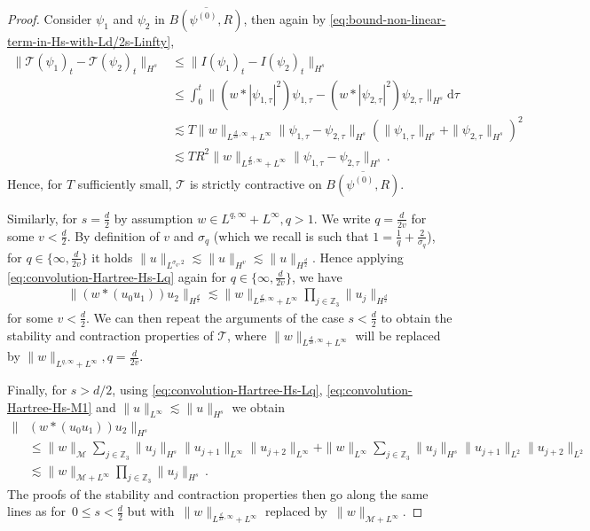 \documentclass[12pt]{article}
\theoremstyle{plain}
\newcommand{\meas}{\mathcal{M}}
\begin{document}
\begin{proof}
Consider $\psi_{1}$ and $\psi_{2}$ in $\overline{B(\psi^{(0)},R)}$,
then again by \eqref{eq:bound-non-linear-term-in-Hs-with-Ld/2s-Linfty},
\begin{align*}
\|\mathcal{T}(\psi_{1})_{t}-\mathcal{T}(\psi_{2})_{t}\|_{H^{s}} & \leq\|I(\psi_{1})_{t}-I(\psi_{2})_{t}\|_{H^{s}}\\
 & \leq\int_{0}^{t}\|(w*|\psi_{1,\tau}|^{2})\psi_{1,\tau}-(w*|\psi_{2,\tau}|^{2})\psi_{2,\tau}\|_{H^{s}}\mathrm{d}\tau\\
 & \lesssim T\|w\|_{L^{\frac{d}{2s},\infty}+L^{\infty}}\|\psi_{1,\tau}-\psi_{2,\tau}\|_{H^{s}}(\|\psi_{1,\tau}\|_{H^{s}}+\|\psi_{2,\tau}\|_{H^{s}})^{2}\\
 & \lesssim TR^{2}\|w\|_{L^{\frac{d}{2s},\infty}+L^{\infty}}\|\psi_{1,\tau}-\psi_{2,\tau}\|_{H^{s}}\,.
\end{align*}
Hence, for $T$ sufficiently small, $\mathcal{T}$ is strictly contractive
on $\overline{B(\psi^{(0)},R)}$.

Similarly, for $s = \frac{d}{2}$ by assumption $ w\in L^{q, \infty} + L^\infty, q>1.$ We write $q = \frac{d}{2v}$ for some $v<\frac{d}{2}$. By definition of $v$ and  $\sigma_q$ (which we recall is such that $1=\frac{1}{q}+\frac{2}{\sigma_{q}}$), for $q\in\{\infty,\frac{d}{2v}\}$ it holds $\|u\|_{L^{\sigma_q,2}}\lesssim \|u\|_{H^v}\lesssim \|u\|_{H^{\frac{d}{2}}}$. Hence applying \eqref{eq:convolution-Hartree-Hs-Lq} again for $q\in\{\infty,\frac{d}{2v}\}$, we have 
\begin{align}
\label{eq:bound-non-linear-term-in-Hd/2-with-Lq-Linfty}
    \|(w*(u_{0}u_{1}))u_{2}\|_{H^{ \frac{d}{2}}} \lesssim\|w\|_{L^{\frac{d}{2v},\infty}+L^{\infty}}\prod_{j\in\mathbb{Z}_{3}}\|u_{j}\|_{H^{ \frac{d}{2}}}\,
\end{align}
for some $v<\frac{d}{2}$. We can then repeat the arguments of the case $s<\frac{d}{2}$ to obtain the stability and contraction properties of $\mathcal{T}$, where $\|w\|_{L^{\frac{d}{2s},\infty}+L^{\infty}}$ will be replaced by $\|w\|_{L^{q,\infty}+L^{\infty}}, q=\frac{d}{2v}$. 
    

Finally, for $s>d/2$, using \eqref{eq:convolution-Hartree-Hs-Lq}, \eqref{eq:convolution-Hartree-Hs-M1} and $\|u\|_{L^{\infty}}\lesssim\|u\|_{H^{s}}$
we obtain
\begin{align}
\|&(w*(u_{0}u_{1}))u_{2}\|_{H^{s}} \nonumber \\ &\leq\|w\|_{\meas}\sum_{j\in\mathbb{Z}_{3}}\|u_{j}\|_{H^{s}}\|u_{j+1}\|_{L^{\infty}}\|u_{j+2}\|_{L^{\infty}} +\|w\|_{L^{\infty}}\sum_{j\in\mathbb{Z}_{3}}\|u_{j}\|_{H^{s}}\|u_{j+1}\|_{L^{2}}\|u_{j+2}\|_{L^{2}}\nonumber \\
 & \lesssim\|w\|_{\meas+L^{\infty}}\prod_{j\in\mathbb{Z}_{3}}\|u_{j}\|_{H^{s}}\,.\label{eq:eq:bound-non-linear-term-in-Hs-with-measure-Linfty}
\end{align}
The proofs of the stability and contraction properties then go along
the same lines as for~$0\leq s<\frac{d}{2}$ but with~$\|w\|_{L^{\frac{d}{2s},\infty}+L^{\infty}}$
replaced by~$\|w\|_{\meas+L^{\infty}}$.


\end{proof}
\end{document}
